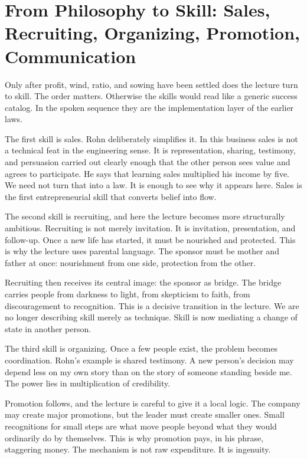 \section{From Philosophy to Skill: Sales, Recruiting, Organizing, Promotion, Communication}

Only after profit, wind, ratio, and sowing have been settled does the lecture turn to skill. The order matters. Otherwise the skills would read like a generic success catalog. In the spoken sequence they are the implementation layer of the earlier laws.

The first skill is sales. Rohn deliberately simplifies it. In this business sales is not a technical feat in the engineering sense. It is representation, sharing, testimony, and persuasion carried out clearly enough that the other person sees value and agrees to participate. He says that learning sales multiplied his income by five. We need not turn that into a law. It is enough to see why it appears here. Sales is the first entrepreneurial skill that converts belief into flow.

The second skill is recruiting, and here the lecture becomes more structurally ambitious. Recruiting is not merely invitation. It is invitation, presentation, and follow-up. Once a new life has started, it must be nourished and protected. This is why the lecture uses parental language. The sponsor must be mother and father at once: nourishment from one side, protection from the other.

Recruiting then receives its central image: the sponsor as bridge. The bridge carries people from darkness to light, from skepticism to faith, from discouragement to recognition. This is a decisive transition in the lecture. We are no longer describing skill merely as technique. Skill is now mediating a change of state in another person.

The third skill is organizing. Once a few people exist, the problem becomes coordination. Rohn's example is shared testimony. A new person's decision may depend less on my own story than on the story of someone standing beside me. The power lies in multiplication of credibility.

Promotion follows, and the lecture is careful to give it a local logic. The company may create major promotions, but the leader must create smaller ones. Small recognitions for small steps are what move people beyond what they would ordinarily do by themselves. This is why promotion pays, in his phrase, staggering money. The mechanism is not raw expenditure. It is ingenuity.

